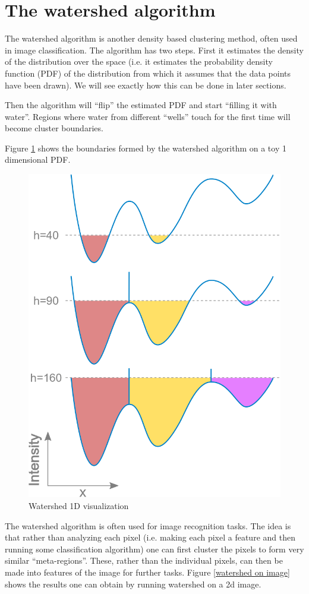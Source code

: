 \section{The watershed algorithm}
  The watershed algorithm is another density based clustering method, often used in image classification.
  The algorithm has two steps. First it estimates the density of the distribution over the space (i.e. 
  it estimates the probability density function (PDF) of the distribution from which it assumes that the data points
  have been drawn). We will see exactly how this can be done in later sections. 
  
  Then the algorithm will ``flip'' the estimated PDF and start ``filling it with water''. Regions where water from different
  ``wells'' touch for the first time will become cluster boundaries.
  
  Figure \ref{watershed 1d} shows the boundaries formed by the watershed algorithm on a toy 1 dimensional PDF.
  
  \begin{figure}[h]\label{watershed 1d}
  \centering
  \includegraphics[width=.7\linewidth]{chapter_2/files/Watershed-flooding-graph.png}
  \caption{Watershed 1D visualization }
  \end{figure}
  
  The watershed algorithm is often used for image recognition tasks. The idea is that rather than 
  analyzing each pixel (i.e. making each pixel a feature and then running some classification algorithm)
  one can first cluster the pixels to form very similar ``meta-regions''. These, rather than the individual pixels,
  can then be made into features of the image for further tasks. Figure \ref{watershed on image} shows the results one can
  obtain by running watershed on a 2d image.
  
